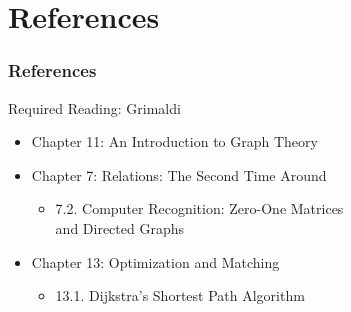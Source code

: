 \documentclass[dvipsnames]{beamer}
\begin{document}

\section*{References}

\begin{frame}
  \frametitle{References}

  \begin{block}{Required Reading: Grimaldi}
    \begin{itemize}
      \item Chapter 11: \alert{An Introduction to Graph Theory}

      \item Chapter 7: Relations: The Second Time Around
      \begin{itemize}
        \item 7.2. \alert{Computer Recognition: Zero-One Matrices\\
                          and Directed Graphs}
      \end{itemize}

      \item Chapter 13: Optimization and Matching
      \begin{itemize}
        \item 13.1. \alert{Dijkstra's Shortest Path Algorithm}
      \end{itemize}
    \end{itemize}
  \end{block}
\end{frame}
\end{document}

